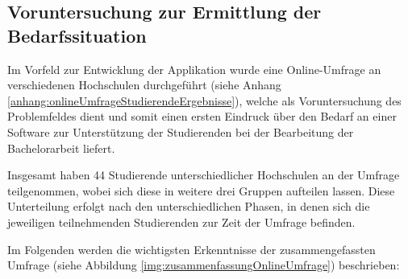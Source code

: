 \documentclass[bibliography=totoc,listof=totoc,BCOR=5mm,DIV=12,oneside]{scrbook}
\begin{document}
\newpage
\subsection{Voruntersuchung zur Ermittlung der Bedarfssituation}
\par \bigskip Im Vorfeld zur Entwicklung der Applikation wurde eine Online-Umfrage an verschiedenen Hochschulen durchgeführt (siehe Anhang \ref{anhang:onlineUmfrageStudierendeErgebnisse}), welche als Voruntersuchung des Problemfeldes dient und somit einen ersten Eindruck über den Bedarf an einer Software zur Unterstützung der Studierenden bei der Bearbeitung der Bachelorarbeit liefert.

\par \bigskip Insgesamt haben 44 Studierende unterschiedlicher Hochschulen an der Umfrage teilgenommen, wobei sich diese in weitere drei Gruppen aufteilen lassen. Diese Unterteilung erfolgt nach den unterschiedlichen Phasen, in denen sich die jeweiligen teilnehmenden Studierenden zur Zeit der Umfrage befinden. 

\par \bigskip Im Folgenden werden die wichtigsten Erkenntnisse der zusammengefassten Umfrage (siehe Abbildung \ref{img:zusammenfassungOnlineUmfrage}) beschrieben:
\end{document}
